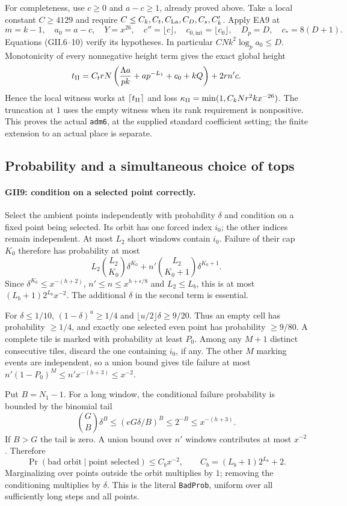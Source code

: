 \documentclass[11pt,a4paper]{article}
\numberwithin{equation}{section}
\theoremstyle{remark}\newtheorem{remark}[theorem]{Remark}
\begin{document}
For completeness, use $c\ge0$ and $a-c\ge1$, already proved above.
Take a local constant $C\ge4129$ and require
$C\le C_k,C_t,C_{\rm La},C_D,C_s,C_k'$. Apply EA9 at
\[
 m=k-1,\quad a_0=a-c,\quad Y=x^{26},\quad
 c''=\lfloor c\rfloor,\quad c_{0,\mathrm{int}}=\lfloor c_0\rfloor,
 \quad D_p=D,\quad c_*=8(D+1).
\]
Equations (GII.6--10) verify its hypotheses. In particular
$CNk^2\log_pa_0\le D$. Monotonicity of every nonnegative height term
gives the exact global height
\[
 t_{\rm II}=C_t rN\left(\frac{\Lambda a}{pk}+ap^{-L_1}+c_0+kQ\right)+2rn'c.
\]
Hence the local witness works at $\lceil t_{\rm II}\rceil$ and loss
$\kappa_{\rm II}=\min(1,C_kNr^2kx^{-26})$. The truncation at $1$ uses
the empty witness when its rank requirement is nonpositive. This proves
the actual \texttt{adm6}, at the supplied standard coefficient setting;
the finite extension to an actual place is separate.

\subsection{Probability and a simultaneous choice of tops}

\paragraph{GII9: condition on a selected point correctly.}
Select the ambient points independently with probability $\delta$ and
condition on a fixed point being selected. Its orbit has one forced
index $i_0$; the other indices remain independent. At most $L_2$ short
windows contain $i_0$. Failure of their cap $K_0$ therefore has probability
at most
\[
 L_2\binom{L_2}{K_0}\delta^{K_0}
 +n'\binom{L_2}{K_0+1}\delta^{K_0+1}.
\]
Since $\delta^{K_0}\le x^{-(h+2)}$, $n'\le n\le x^{h+\epsilon/8}$
and $L_2\le L_b$, this is at most $(L_b+1)2^{L_b}x^{-2}$.
The additional $\delta$ in the second term is essential.

For $\delta\le1/10$, $(1-\delta)^u\ge1/4$ and
$\lfloor u/2\rfloor\delta\ge9/20$. Thus an empty cell has probability
$\ge1/4$, and exactly one selected even point has probability $\ge9/80$.
A complete tile is marked with probability at least $P_0$.
Among any $M+1$ distinct consecutive tiles, discard the one containing
$i_0$, if any. The other $M$ marking events are independent, so a union
bound gives tile failure at most
$n'(1-P_0)^M\le n'x^{-(h+3)}\le x^{-2}$.

Put $B=N_1-1$. For a long window, the conditional failure probability
is bounded by the binomial tail
\[
 \binom GB\delta^B\le(eG\delta/B)^B\le2^{-B}\le x^{-(h+3)}.
\]
If $B>G$ the tail is zero. A union bound over $n'$ windows contributes
at most $x^{-2}$. Therefore
\[
 \Pr(\text{bad orbit}\mid\text{point selected})\le C_bx^{-2},
 \qquad C_b=(L_b+1)2^{L_b}+2.\tag{GII.12}
\]
Marginalizing over points outside the orbit multiplies by $1$; removing
the conditioning multiplies by $\delta$. This is the literal
\texttt{BadProb}, uniform over all sufficiently long steps and all points.
\end{document}
